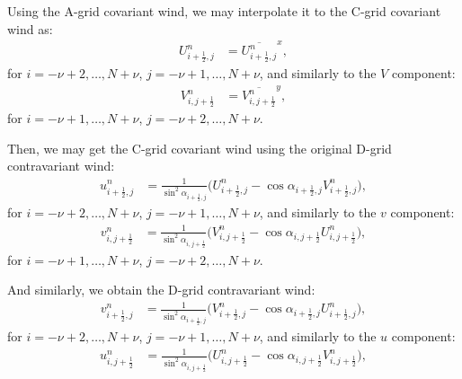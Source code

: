 Using the A-grid covariant wind, we may interpolate it to the C-grid covariant wind as:
\begin{align}
	\label{d2a-uu}
	U_{i+\frac{1}{2},j}^n &= \overline{U_{i+\frac{1}{2},j}^n}^x,
\end{align}
for $i=-\nu+2,\ldots,N+\nu$, $j=-\nu+1,\ldots,N+\nu$, and similarly to the $V$ component:
\begin{align}
	\label{d2a-vv}
	V_{i,j+\frac{1}{2}}^n &= \overline{V_{i,j+\frac{1}{2}}^n}^y,
\end{align}
for $i=-\nu+1,\ldots,N+\nu$, $j=-\nu+2,\ldots,N+\nu$.

Then, we may get the C-grid covariant wind using the original D-grid contravariant wind:
\begin{align}
	\label{d2a-uuu}
	u_{i+\frac{1}{2},j}^n &= \frac{1}{\sin^2{\alpha_{i+\frac{1}{2},j}}}
	\bigg({U_{i+\frac{1}{2},j}^n} - \cos{\alpha_{i+\frac{1}{2},j}} {V_{i+\frac{1}{2},j}^n}\bigg),
\end{align}
for $i=-\nu+2,\ldots,N+\nu$, $j=-\nu+1,\ldots,N+\nu$, and similarly to the $v$ component:
\begin{align}
	\label{d2a-vvv}
	v_{i,j+\frac{1}{2}}^n &= \frac{1}{\sin^2{\alpha_{i,j+\frac{1}{2}}}}
	\bigg({V_{i,j+\frac{1}{2}}^n} - \cos{\alpha_{i,j+\frac{1}{2}}}{U_{i,j+\frac{1}{2}}^n}\bigg),
\end{align}
for $i=-\nu+1,\ldots,N+\nu$, $j=-\nu+2,\ldots,N+\nu$.

And similarly, we obtain the D-grid contravariant wind:
\begin{align}
	\label{d2a-uuuu}
	v_{i+\frac{1}{2},j}^n &= \frac{1}{\sin^2{\alpha_{i+\frac{1}{2},j}}}
	\bigg({V_{i+\frac{1}{2},j}^n} - \cos{\alpha_{i+\frac{1}{2},j}} {U_{i+\frac{1}{2},j}^n}\bigg),
\end{align}
for $i=-\nu+2,\ldots,N+\nu$, $j=-\nu+1,\ldots,N+\nu$, and similarly to the $u$ component:
\begin{align}
	\label{d2a-vvvv}
	u_{i,j+\frac{1}{2}}^n &= \frac{1}{\sin^2{\alpha_{i,j+\frac{1}{2}}}}
	\bigg({U_{i,j+\frac{1}{2}}^n} - \cos{\alpha_{i,j+\frac{1}{2}}}{V_{i,j+\frac{1}{2}}^n}\bigg),
\end{align}
